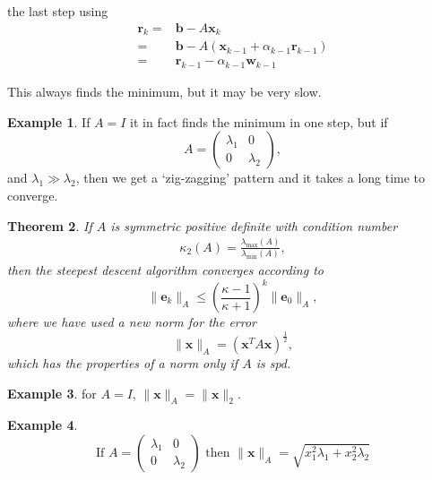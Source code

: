 \documentclass[12pt, a4paper]{article}
\renewcommand{\vec}[1]{\mathbf{#1}}
\newtheorem{thm}{Theorem}[section]
\theoremstyle{definition}
\newtheorem{example}[thm]{Example}
\theoremstyle{remark}
\numberwithin{equation}{section}
\begin{document}
the last step using
\begin{align*}
\vec{r}_k=&\vec{b}-A\vec{x}_k\\
=&\vec{b}-A(\vec{x}_{k-1}+\alpha_{k-1}\vec{r}_{k-1})\\
=&\vec{r}_{k-1}-\alpha_{k-1}\vec{w}_{k-1}
\end{align*}

This always finds the minimum, but it may be very slow.
\begin{example} If $A=I$ it in fact finds the minimum in one step, but if 
\begin{equation*}
A=
\begin{pmatrix}
\lambda_1 & 0 \\
0& \lambda_2
\end{pmatrix},
\end{equation*}
and $\lambda_1 \gg \lambda_2$, then we get a `zig-zagging' pattern and it takes a long time to converge.

\end{example}

\begin{thm}
If $A$ is symmetric positive definite with condition number 
\begin{align*}
\kappa_2(A) = \frac{\lambda_{\max} (A)}{\lambda_{\min} (A)},
\end{align*}
then the steepest descent algorithm converges according to
\begin{equation*}
\|\vec{e}_k\|_A \le \left(\frac{\kappa-1}{\kappa+1}\right)^k\|\vec{e}_0\|_A,
\end{equation*}
where we have used a new norm for the error 
\begin{equation*}
\|\vec{x}\|_A=(\vec{x}^TA\vec{x})^{\frac{1}{2}},
\end{equation*}
which has the properties of a norm only if $A$ is spd. 
\end{thm}
\begin{example}
for $A=I$, $\|\vec{x}\|_A=\|\vec{x}\|_2$.
\end{example}


\begin{example}
\begin{equation*}
\mbox{If } A=
\begin{pmatrix}
\lambda_1 & 0 \\
0 & \lambda_2
\end{pmatrix}
\mbox{ then }
\|\vec{x}\|_A=\sqrt{x_1^2\lambda_1+x_2^2\lambda_2}
\end{equation*}
\end{example}
\end{document}

